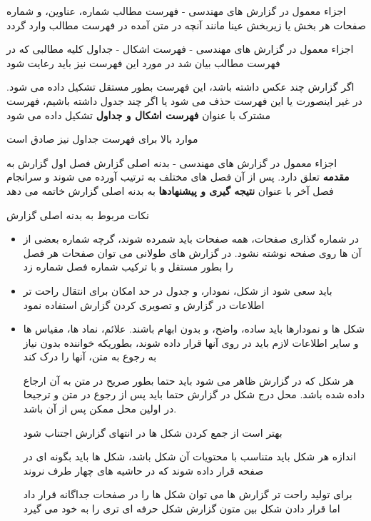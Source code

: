 \documentclass[14pt]{beamer}
\makeatletter
\newcommand{\rtlist}{\raggedleft\rightskip\@totalleftmargin}
\newcommand{\framefontsizelarge}{\fontsize{18pt}{0pt}\selectfont}
\newcommand{\frametitlefontsize}{\fontsize{20pt}{0pt}\selectfont}
\newcommand{\defaultvspace}{\vspace{5mm}}
\makeatother
\begin{document}
\begin{persian}
\begin{frame}[plain]{\frametitlefontsize  اجزاء معمول در گزارش های مهندسی - فهرست مطالب}
		شماره، عناوین، و شماره صفحات هر بخش یا زیربخش عینا مانند آنچه در متن آمده در فهرست مطالب وارد گردد
	\end{frame}	
	
	\begin{frame}[plain]{\frametitlefontsize  اجزاء معمول در گزارش های مهندسی - فهرست اشکال - جداول}
		\framefontsizelarge
		کلیه مطالبی که در فهرست مطالب بیان شد در مورد این فهرست نیز باید رعایت شود
		
		اگر گزارش چند عکس داشته باشد، این فهرست بطور مستقل تشکیل داده می شود. در غیر اینصورت یا این فهرست حذف می شود یا اگر چند جدول داشته باشیم، فهرست مشترک با عنوان \textbf{فهرست اشکال و جداول} تشکیل داده می شود
		\defaultvspace
		
		موارد بالا برای فهرست جداول نیز صادق است
	\end{frame}	
	
	\begin{frame}[allowframebreaks]{\frametitlefontsize  اجزاء معمول در گزارش های مهندسی - بدنه اصلی گزارش}
		\framefontsizelarge
		فصل اول گزارش به \textbf{مقدمه} تعلق دارد. پس از آن فصل های مختلف به ترتیب آورده می شوند و سرانجام فصل آخر با عنوان \textbf{نتیجه گیری و پیشنهادها} به بدنه اصلی گزارش خاتمه می دهد
		\defaultvspace
		
		نکات مربوط به بدنه اصلی گزارش
		\begin{itemize}\rtlist
			\item در شماره گذاری صفحات، همه صفحات باید شمرده شوند، گرچه شماره بعضی از آن ها روی صفحه نوشته نشود. در گزارش های طولانی می توان صفحات هر فصل را بطور مستقل و با ترکیب شماره فصل شماره زد
			\item باید سعی شود از شکل، نمودار، و جدول در حد امکان برای انتقال راحت تر اطلاعات در گزارش و تصویری کردن گزارش استفاده نمود
			\item شکل ها و نمودارها باید ساده، واضح، و بدون ابهام باشند. علائم، نماد ها، مقیاس ها و سایر اطلاعات لازم باید در روی آنها قرار داده شوند، بطوریکه خواننده بدون نیاز به رجوع به متن، آنها را درک کند
			
			هر شکل که در گزارش ظاهر می شود باید حتما بطور صریح در متن به آن ارجاع داده شده باشد. محل درج شکل در گزارش حتما باید پس از رجوع در متن و ترجیحا در اولین محل ممکن پس از آن باشد.
			
			بهتر است از جمع کردن شکل ها در انتهای گزارش اجتناب شود
			
			اندازه هر شکل باید متناسب با محتویات آن شکل باشد، شکل ها باید بگونه ای در صفحه قرار داده شوند که در حاشیه های چهار طرف نروند
			
			برای تولید راحت تر گزارش ها می توان شکل ها را در صفحات جداگانه قرار داد اما قرار دادن شکل بین متون گزارش شکل حرفه ای تری را به خود می گیرد
			

\end{itemize}
\end{frame}
\end{persian}
\end{document}
